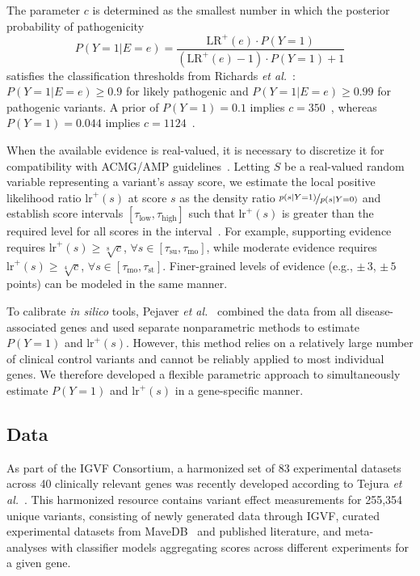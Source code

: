 \documentclass[11pt]{article}
\theoremstyle{plain}
\newcommand{\NumDatasetsMalvika}{83 }
\newcommand{\NumGenes}{40 }
\begin{document}
The parameter $c$ is determined as the smallest number in which the posterior probability of pathogenicity
\begin{equation}
    P(Y= 1|E = e) = \frac{\text{LR}^+(e) \cdot P(Y=1)}{(\text{LR}^+(e)-1)\cdot P(Y=1)+1}
    \label{eq:posterior}
\end{equation}
satisfies the classification thresholds from Richards \textit{et al.}~\cite{richards2015standards}: $P(Y= 1|E = e) \geq 0.9$ for likely pathogenic and $P(Y= 1|E = e) \geq 0.99$ for pathogenic variants. A prior of $P(Y=1)=0.1$ implies $c=350$~\cite{tavtigian2018modeling}, whereas $P(Y=1)=0.044$ implies $c=1124$~\cite{pejaver2022calibration}.

When the available evidence is real-valued, it is necessary to discretize it for compatibility with ACMG/AMP guidelines~\cite{richards2015standards}. Letting $S$ be a real-valued random variable representing a variant's assay score, we estimate the local positive likelihood ratio $\text{lr}^+(s)$ at score $s$ as the density ratio $\nicefrac{p(s|Y=1)}{p(s|Y=0)}$ and establish score intervals $[\tau_{\textrm{low}}, \tau_{\textrm{high}}]$ such that $\text{lr}^+(s)$ is greater than the required level for all scores in the interval~\cite{pejaver2022calibration}. For example, supporting evidence requires $\text{lr}^+(s) \geq \sqrt[8]{c}$, $\forall s\in [\tau_{\textrm{su}}, \tau_{\textrm{mo}}]$, while moderate evidence requires $\text{lr}^+(s) \geq \sqrt[4]{c}$, $\forall s\in [\tau_{\textrm{mo}}, \tau_{\textrm{st}}]$. Finer-grained levels of evidence (e.g., $\pm\,3$, $\pm\,5$ points) can be modeled in the same manner.

To calibrate \textit{in silico} tools, Pejaver \textit{et al.}~\cite{pejaver2022calibration} combined the data from all disease-associated genes and used separate nonparametric methods to estimate $P(Y=1)$ and $\text{lr}^+(s)$. However, this method relies on a relatively large number of clinical control variants and cannot be reliably applied to most individual genes. We therefore developed a flexible parametric approach to simultaneously estimate $P(Y=1)$ and $\text{lr}^+(s)$ in a gene-specific manner.

\subsection*{Data}
\label{sec:data}
As part of the IGVF Consortium, a harmonized set of \NumDatasetsMalvika experimental datasets across \NumGenes clinically relevant genes was recently developed according to Tejura \textit{et al.}~\cite{igvf_pp}. This harmonized resource contains variant effect measurements for 255,354 unique variants, consisting of newly generated data through IGVF, curated experimental datasets from MaveDB~\cite{rubin2025_mavedb} and published literature, and meta-analyses with classifier models aggregating scores across different experiments for a given gene.
\end{document}
